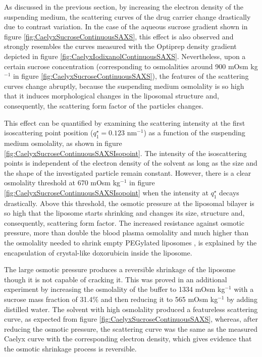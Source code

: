 As discussed in the previous section, by increasing the electron density of the suspending medium, the scattering curves of the drug carrier change drastically due to contrast variation. In the case of the aqueous sucrose gradient shown in figure \ref{fig:CaelyxSucroseContinuousSAXS}, this effect is also observed and strongly resembles the curves measured with the Optiprep density gradient depicted in figure \ref{fig:CaelyxIodixanolContinuousSAXS}. Nevertheless, upon a certain sucrose concentration (corresponding to osmolalities around 900 mOsm kg$^{-1}$ in figure \ref{fig:CaelyxSucroseContinuousSAXS}), the features of the scattering curves change abruptly, because the suspending medium osmolality is so high that it induces morphological changes in the liposomal structure and, consequently, the scattering form factor of the particles changes.

This effect can be quantified by examining the scattering intensity at the first isoscattering point position ($q^{\star}_1 = 0.123$ nm$^{-1}$) as a function of the suspending medium osmolality, as shown in figure \ref{fig:CaelyxSucroseContinuousSAXSIsopoint}. The intensity of the isoscattering points is independent of the electron density of the solvent as long as the size and the shape of the investigated particle remain constant. However, there is a clear osmolality threshold at 670 mOsm kg$^{-1}$ in figure \ref{fig:CaelyxSucroseContinuousSAXSIsopoint} when the intensity at $q^{\star}_1$ decays drastically. Above this threshold, the osmotic pressure at the liposomal bilayer is so high that the liposome starts shrinking and changes its size, structure and, consequently, scattering form factor. The increased resistance against osmotic pressure, more than double the blood plasma osmolality and much higher than the osmolality needed to shrink empty PEGylated liposomes \citep{varga_osmotic_2014}, is explained by the encapsulation of crystal-like doxorubicin inside the liposome.

The large osmotic pressure produces a reversible shrinkage of the liposome though it is not capable of cracking it. This was proved in an additional experiment by increasing the osmolality of the buffer to 1334 mOsm kg$^{-1}$ with a sucrose mass fraction of 31.4$\%$ and then reducing it to 565 mOsm kg$^{-1}$ by adding distilled water. The solvent with high osmolality produced a featureless scattering curve, as expected from figure \ref{fig:CaelyxSucroseContinuousSAXS}, whereas, after reducing the osmotic pressure, the scattering curve was the same as the measured Caelyx curve with the corresponding electron density, which gives evidence that the osmotic shrinkage process is reversible.

